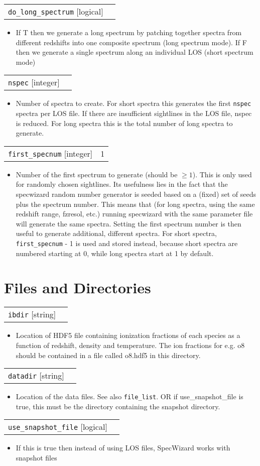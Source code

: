 \documentclass{report}
\makeatletter
\newcommand{\paramdefinition}[3]{
\begin{tabular*}{\textwidth}{l@{\extracolsep{\fill}}r}
		{\tt #1} [{\sc #2}]& #3 \\
\end{tabular*}}
\newcommand{\paramdescription}[1]{
\begin{itemize}
\item #1
\end{itemize}\vspace{0.2cm}}
\newcommand{\param}[1]{{\tt #1}}
\makeatother
\begin{document}
\paramdefinition{do\_long\_spectrum}{logical}{}
\paramdescription{If T then we generate a long spectrum by patching together spectra from different redshifts into one composite spectrum (long spectrum mode).  If F then we generate a single spectrum along an individual LOS (short spectrum mode)}

\paramdefinition{nspec}{integer}{}
\paramdescription{Number of spectra to create.  For short spectra this generates the first {\tt nspec} spectra per LOS file. If there are insufficient sightlines in the LOS file, nspec is reduced. For long spectra this is the total number of long spectra to generate.}

\paramdefinition{first\_specnum}{integer}{1}
\paramdescription{Number of the first spectrum to generate (should be $\geq 1$). This is only used for randomly chosen sightlines. Its usefulness lies in the fact that the specwizard random number generator is seeded based on a (fixed) set of seeds plus the spectrum number. This means that (for long spectra, using the same redshift range, fzresol, etc.) running specwizard with the same parameter file will generate the same spectra. Setting the first spectrum number is then useful to generate additional, different spectra. For short spectra, \param{first\_specnum} - 1 is used and stored instead, because short spectra are numbered starting at 0, while long spectra start at 1 by default.}

\section{Files and Directories}

\paramdefinition{ibdir}{string}{}
\paramdescription{Location of HDF5 file containing ionization fractions of each species as a function of redshift, density and temperature. The ion fractions for e.g. o8 should be contained in a file called o8.hdf5 in this directory.}

\paramdefinition{datadir}{string}{}
\paramdescription{Location of the data files.  See also \param{file\_list}.
OR if use\_snapshot\_file is true, this must be the directory containing the snapshot directory.}

\paramdefinition{use\_snapshot\_file}{logical}{}
\paramdescription{If this is true then instead of using LOS files, SpecWizard works with snapshot files}
\end{document}
